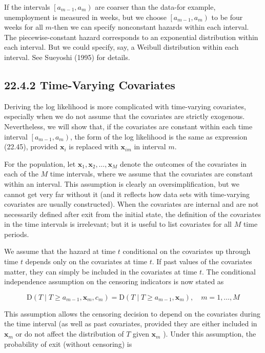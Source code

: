 \documentclass[10pt]{article}
\begin{document}
If the intervals $\left[a_{m-1}, a_{m}\right)$ are coarser than the data-for example, unemployment is measured in weeks, but we choose $\left[a_{m-1}, a_{m}\right)$ to be four weeks for all $m$-then we can specify nonconstant hazards within each interval. The piecewise-constant hazard corresponds to an exponential distribution within each interval. But we could specify, say, a Weibull distribution within each interval. See Sueyoshi (1995) for details.

\subsection*{22.4.2 Time-Varying Covariates}
Deriving the log likelihood is more complicated with time-varying covariates, especially when we do not assume that the covariates are strictly exogenous. Nevertheless, we will show that, if the covariates are constant within each time interval $\left[a_{m-1}, a_{m}\right)$, the form of the log likelihood is the same as expression (22.45), provided $\mathbf{x}_{i}$ is replaced with $\mathbf{x}_{i m}$ in interval $m$.

For the population, let $\mathbf{x}_{1}, \mathbf{x}_{2}, \ldots, \mathbf{x}_{M}$ denote the outcomes of the covariates in each of the $M$ time intervals, where we assume that the covariates are constant within an interval. This assumption is clearly an oversimplification, but we cannot get very far without it (and it reflects how data sets with time-varying covariates are usually constructed). When the covariates are internal and are not necessarily defined after exit from the initial state, the definition of the covariates in the time intervals is irrelevant; but it is useful to list covariates for all $M$ time periods.

We assume that the hazard at time $t$ conditional on the covariates up through time $t$ depends only on the covariates at time $t$. If past values of the covariates matter, they can simply be included in the covariates at time $t$. The conditional independence assumption on the censoring indicators is now stated as


\begin{equation*}
\mathrm{D}\left(T \mid T \geq a_{m-1}, \mathbf{x}_{m}, c_{m}\right)=\mathrm{D}\left(T \mid T \geq a_{m-1}, \mathbf{x}_{m}\right), \quad m=1, \ldots, M \tag{22.50}
\end{equation*}


This assumption allows the censoring decision to depend on the covariates during the time interval (as well as past covariates, provided they are either included in $\mathbf{x}_{m}$ or do not affect the distribution of $T$ given $\mathbf{x}_{m}$ ). Under this assumption, the probability of exit (without censoring) is
\end{document}
